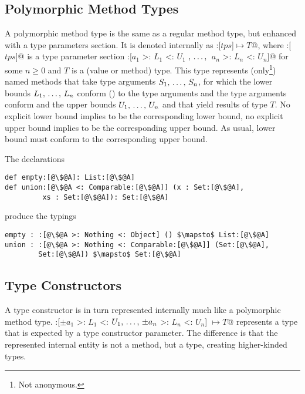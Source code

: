 \subsection{Polymorphic Method Types}
\label{sec:polymorphic-method-types}

A polymorphic method type is the same as a regular method type, but enhanced with a type parameters section. It is denoted internally as \lstinline@:[$tps$]$ \mapsto T$@, where \lstinline@:[$tps$]@ is a type parameter section \lstinline@:[$a_1$ >: $L_1$ <: $U_1$ $,\, \ldots ,\,$ $a_n$ >: $L_n$ <: $U_n$]@ for some $n \geq 0$ and $T$ is a (value or method) type. This type represents (only\footnote{Not anonymous.}) named methods that take type arguments $S_1 ,\, \ldots ,\, S_n$, for which the lower bounds $L_1 ,\, \ldots ,\, L_n$ conform () to the type arguments and the type arguments conform and the upper bounds $U_1 ,\, \ldots ,\, U_n$ and that yield results of type $T$. No explicit lower bound implies  to be the corresponding lower bound, no explicit upper bound implies  to be the corresponding upper bound. As usual, lower bound must conform to the corresponding upper bound. 

\example The declarations
\begin{lstlisting}[escapechar=@,deletekeywords={union}]
def empty:[@\$@A]: List:[@\$@A]
def union:[@\$@A <: Comparable:[@\$@A]] (x : Set:[@\$@A], 
         xs : Set:[@\$@A]): Set:[@\$@A]
\end{lstlisting}
produce the typings
\begin{lstlisting}[escapechar=@,deletekeywords={union}]
empty : :[@\$@A >: Nothing <: Object] () $\mapsto$ List:[@\$@A]
union : :[@\$@A >: Nothing <: Comparable:[@\$@A]] (Set:[@\$@A], 
        Set:[@\$@A]) $\mapsto$ Set:[@\$@A]
\end{lstlisting}






\subsection{Type Constructors}
\label{sec:type-constructors}

A type constructor is in turn represented internally much like a polymorphic method type. \lstinline@:[$\pm a_1$ >: $L_1$ <: $U_1 ,\, \ldots ,\, \pm a_n$ >: $L_n$ <: $U_n$] $\mapsto T$@ represents a type that is expected by a type constructor parameter. The difference is that the represented internal entity is not a method, but a type, creating higher-kinded types. 






